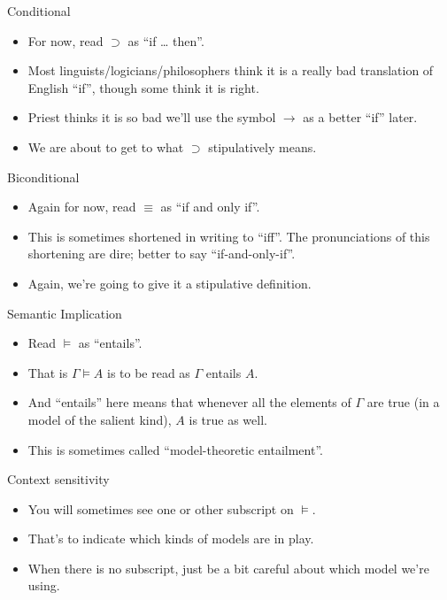 \documentclass[
  17pt,
  letterpaper,
  ignorenonframetext,
  aspectratio=169,
  handout]{beamer}
\providecommand{\tightlist}{%
  \setlength{\itemsep}{0pt}\setlength{\parskip}{0pt}}\usepackage{longtable,booktabs,array}
\begin{document}
\begin{frame}{Conditional}
\protect\hypertarget{conditional}{}
\begin{itemize}[<+->]
\tightlist
\item
  For now, read \(\supset\) as ``if \ldots{} then''.
\item
  Most linguists/logicians/philosophers think it is a really bad
  translation of English ``if'', though some think it is right.
\item
  Priest thinks it is so bad we'll use the symbol \(\rightarrow\) as a
  better ``if'' later.
\item
  We are about to get to what \(\supset\) stipulatively means.
\end{itemize}
\end{frame}

\begin{frame}{Biconditional}
\protect\hypertarget{biconditional}{}
\begin{itemize}[<+->]
\tightlist
\item
  Again for now, read \(\equiv\) as ``if and only if''.
\item
  This is sometimes shortened in writing to ``iff''. The pronunciations
  of this shortening are dire; better to say ``if-and-only-if''.
\item
  Again, we're going to give it a stipulative definition.
\end{itemize}
\end{frame}

\begin{frame}{Semantic Implication}
\protect\hypertarget{semantic-implication}{}
\begin{itemize}[<+->]
\tightlist
\item
  Read \(\vDash\) as ``entails''.
\item
  That is \(\Gamma \vDash A\) is to be read as \(\Gamma\) entails \(A\).
\item
  And ``entails'' here means that whenever all the elements of
  \(\Gamma\) are true (in a model of the salient kind), \(A\) is true as
  well.
\item
  This is sometimes called ``model-theoretic entailment''.
\end{itemize}
\end{frame}

\begin{frame}{Context sensitivity}
\protect\hypertarget{context-sensitivity}{}
\begin{itemize}[<+->]
\tightlist
\item
  You will sometimes see one or other subscript on \(\vDash\).
\item
  That's to indicate which kinds of models are in play.
\item
  When there is no subscript, just be a bit careful about which model
  we're using.
\end{itemize}
\end{frame}
\end{document}
